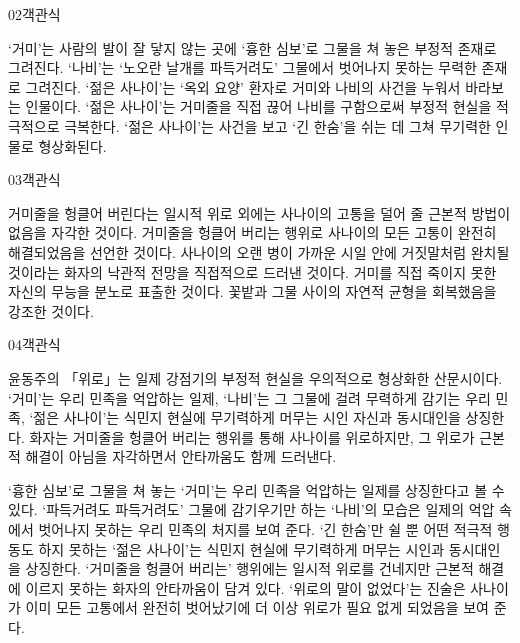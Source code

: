 \documentclass[fs85,seriesWit]{korfarm-base}
\begin{document}
\begin{kfQBlock}{02}{객관식}
\begin{kfChoices}
\kfChoice ‘거미’는 사람의 발이 잘 닿지 않는 곳에 ‘흉한 심보’로 그물을 쳐 놓은 부정적 존재로 그려진다.
\kfChoice ‘나비’는 ‘노오란 날개를 파득거려도’ 그물에서 벗어나지 못하는 무력한 존재로 그려진다.
\kfChoice ‘젊은 사나이’는 ‘옥외 요양’ 환자로 거미와 나비의 사건을 누워서 바라보는 인물이다.
\kfChoice ‘젊은 사나이’는 거미줄을 직접 끊어 나비를 구함으로써 부정적 현실을 적극적으로 극복한다.
\kfChoice ‘젊은 사나이’는 사건을 보고 ‘긴 한숨’을 쉬는 데 그쳐 무기력한 인물로 형상화된다.
\end{kfChoices}
\end{kfQBlock}

\begin{kfQBlock}{03}{객관식}
\begin{kfChoices}
\kfChoice 거미줄을 헝클어 버린다는 일시적 위로 외에는 사나이의 고통을 덜어 줄 근본적 방법이 없음을 자각한 것이다.
\kfChoice 거미줄을 헝클어 버리는 행위로 사나이의 모든 고통이 완전히 해결되었음을 선언한 것이다.
\kfChoice 사나이의 오랜 병이 가까운 시일 안에 거짓말처럼 완치될 것이라는 화자의 낙관적 전망을 직접적으로 드러낸 것이다.
\kfChoice 거미를 직접 죽이지 못한 자신의 무능을 분노로 표출한 것이다.
\kfChoice 꽃밭과 그물 사이의 자연적 균형을 회복했음을 강조한 것이다.
\end{kfChoices}
\end{kfQBlock}

\begin{kfQBlock}{04}{객관식}
\begin{kfEvidence}윤동주의 「위로」는 일제 강점기의 부정적 현실을 우의적으로 형상화한 산문시이다. ‘거미’는 우리 민족을 억압하는 일제, ‘나비’는 그 그물에 걸려 무력하게 감기는 우리 민족, ‘젊은 사나이’는 식민지 현실에 무기력하게 머무는 시인 자신과 동시대인을 상징한다. 화자는 거미줄을 헝클어 버리는 행위를 통해 사나이를 위로하지만, 그 위로가 근본적 해결이 아님을 자각하면서 안타까움도 함께 드러낸다.\end{kfEvidence}
\begin{kfChoices}
\kfChoice ‘흉한 심보’로 그물을 쳐 놓는 ‘거미’는 우리 민족을 억압하는 일제를 상징한다고 볼 수 있다.
\kfChoice ‘파득거려도 파득거려도’ 그물에 감기우기만 하는 ‘나비’의 모습은 일제의 억압 속에서 벗어나지 못하는 우리 민족의 처지를 보여 준다.
\kfChoice ‘긴 한숨’만 쉴 뿐 어떤 적극적 행동도 하지 못하는 ‘젊은 사나이’는 식민지 현실에 무기력하게 머무는 시인과 동시대인을 상징한다.
\kfChoice ‘거미줄을 헝클어 버리는’ 행위에는 일시적 위로를 건네지만 근본적 해결에 이르지 못하는 화자의 안타까움이 담겨 있다.
\kfChoice ‘위로의 말이 없었다’는 진술은 사나이가 이미 모든 고통에서 완전히 벗어났기에 더 이상 위로가 필요 없게 되었음을 보여 준다.
\end{kfChoices}
\end{kfQBlock}
\end{document}

